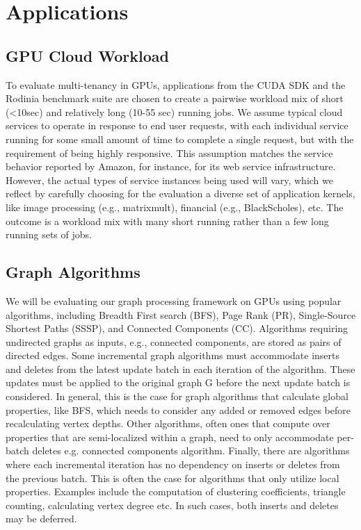 \section{Applications}
\label{applications}

\subsection{GPU Cloud Workload}
To evaluate multi-tenancy in GPUs, applications from the CUDA SDK and the Rodinia benchmark suite are chosen to create a pairwise workload mix of short (\textless  10sec) and relatively long (10-55 sec) running jobs. We assume typical cloud services to operate in response to end user requests, with each individual service running for some small amount of time to complete a single request, but with the requirement of being highly responsive. This assumption matches the service behavior reported by Amazon, for instance, for its web service infrastructure. However, the actual types of service instances being used will vary, which we reflect by carefully choosing for the evaluation a diverse set of application kernels, like image processing (e.g., matrixmult), financial (e.g., BlackScholes), etc. The outcome is a workload mix with many short running rather than a few long running sets of jobs.

\subsection{Graph Algorithms} We will be evaluating our graph processing framework on GPUs using popular algorithms, including Breadth First search (BFS), Page Rank (PR), Single-Source Shortest Paths (SSSP), and Connected Components (CC). Algorithms requiring undirected graphs as inputs, e.g., connected components, are stored as pairs of directed edges.
Some incremental graph algorithms must accommodate inserts and deletes from the latest update batch in each iteration of the algorithm. These updates must be applied to the original graph G before the next update batch is considered. In general, this is the case for graph algorithms that calculate global properties, like BFS, which needs to consider any added or removed edges before recalculating vertex depths. Other algorithms, often ones that compute over properties that are semi-localized within a graph, need to only accommodate per-batch deletes e.g. connected components algorithm. Finally, there are algorithms where each incremental iteration has no dependency on inserts or deletes from the previous batch. This is often the case for algorithms that only utilize local properties. Examples include the computation of clustering coefficients, triangle counting, calculating vertex degree etc. In such cases, both inserts and deletes may be deferred. 

